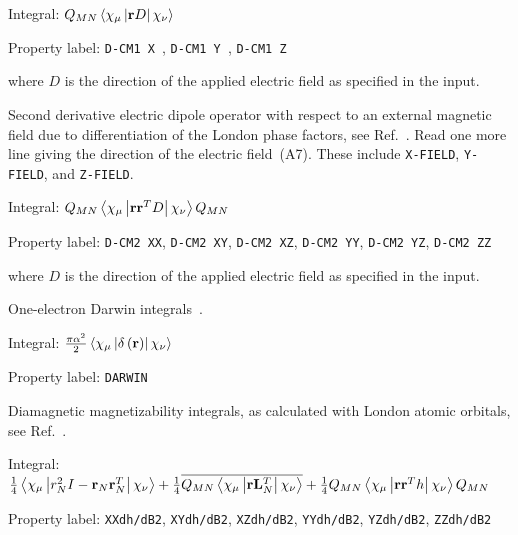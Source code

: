 \begin{description}
\begin{list}{}{}
\item Integral: $Q_{MN}\left<\chi_{\mu}\left|{\bf
r}D\right|\chi_{\nu}\right>$
\item Property label: \verb|D-CM1 X |, \verb|D-CM1 Y |, \verb|D-CM1 Z |
\end{list}
where $D$ is the direction of the applied electric field as specified in
the input.

\item[\Key{CM-2}] Second derivative electric dipole operator
with respect to an external magnetic field due
to differentiation of
the London phase factors, see Ref.~\cite{arthkrabmjpjjcp102}. Read one
more line giving the direction of the electric
field~(A7). These
include \verb|X-FIELD|, \verb|Y-FIELD|, and \verb|Z-FIELD|.

\begin{list}{}{}
\item Integral: $Q_{MN}\left<\chi_{\mu}\left|{\bf
rr}^{T}D\right|\chi_{\nu}\right>Q_{MN}$
\item Property label: \verb|D-CM2 XX|, \verb|D-CM2 XY|, \verb|D-CM2 XZ|,
\verb|D-CM2 YY|, \verb|D-CM2 YZ|, \verb|D-CM2 ZZ|
\end{list}
where $D$ is the direction of the applied electric field as specified in
the input.

\item[\Key{DARWIN}] One-electron Darwin integrals~\cite{skjohjajjcp103}.

\begin{list}{}{}
\item Integral: $\frac{\pi\alpha^{2}}{2}\left<\chi_{\mu}\left|\delta\left({\bf
r}\right)\right|\chi_{\nu}\right>$
\item Property label: \verb|DARWIN  |
\end{list}


\item[\Key{DIASUS}] Diamagnetic magnetizability integrals, as
calculated with London atomic orbitals, see Ref.~\cite{thpjjcp95}.

\begin{list}{}{}
\item Integral: $\frac{1}{4}\left<\chi_{\mu}\left|r^{2}_{N}I - {\bf r}_{N}
{\bf r}_{N}^{T}\right|\chi_{\nu}\right> +\frac{1}{4}
\overline{Q_{MN}\left<\chi_{\mu}\left|{\bf r}{\bf
L}_{N}^{T}\right|\chi_{\nu}\right>} +
\frac{1}{4}Q_{MN}\left<\chi_{\mu}\left|{\bf r}{\bf
r}^{T}h\right|\chi_{\nu}\right>Q_{MN}$
\item Property label: \verb|XXdh/dB2|, \verb|XYdh/dB2|,
\verb|XZdh/dB2|, \verb|YYdh/dB2|, \verb|YZdh/dB2|, \verb|ZZdh/dB2|
\end{list}


\end{description}
